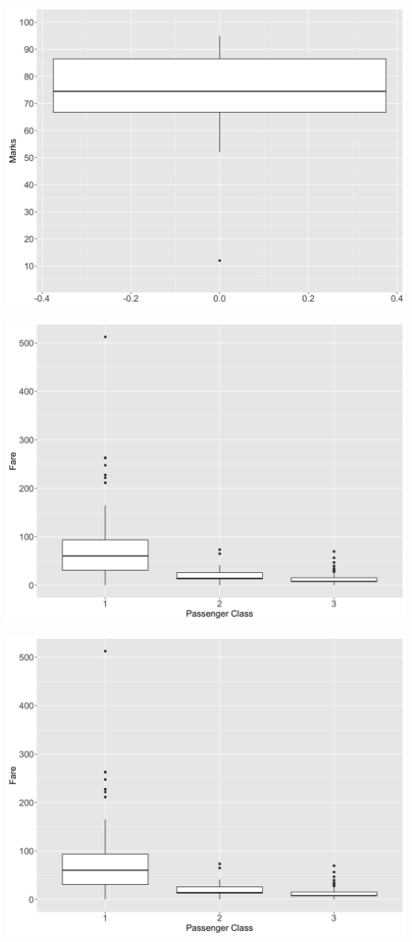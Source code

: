 \documentclass[]{book}
\begin{document}
\begin{center}\includegraphics[width=0.8\linewidth]{figure/boxplot-1} \end{center}

\begin{center}\includegraphics[width=0.8\linewidth]{figure/boxplot2-1} \end{center}

\begin{center}\includegraphics[width=0.8\linewidth]{figure/boxplot3-1} \end{center}
\end{document}
